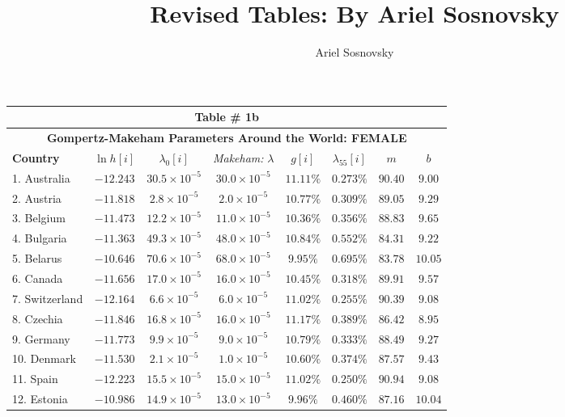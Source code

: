 \documentclass[12pt, titlepage]{article}%
\author{Ariel Sosnovsky}
\begin{document}
 \title{Revised Tables: By Ariel Sosnovsky}
 \maketitle
\clearpage
\begin{table}
\begin{center}
\begin{tabular}{||l|c|c|c|c|c|c|c||}
\hline\hline
\multicolumn{8}{||c||}{Table \# 1b } \\ \hline\hline
\multicolumn{8}{||c||}{{\bf Gompertz-Makeham Parameters Around the World: FEMALE}} \\ \hline\hline
{\bf Country} & $\ln h[i]$ & $\lambda_{0}[i]$ & {\em Makeham:} $\lambda$ & $g[i]$ & $\lambda_{55}[i]$ & $m$ & $b$ \\ \hline \hline
1. Australia &  $-12.243$ & $30.5\times10^{-5}$ & $30.0\times10^{-5}$ & $11.11\%$ & $0.273\%$ & $90.40$ & $9.00$\\ \hline
2. Austria &  $-11.818$ & $2.8\times10^{-5}$ & $2.0\times10^{-5}$ & $10.77\%$ & $0.309\%$ & $89.05$ & $9.29$\\ \hline
3. Belgium &  $-11.473$ & $12.2\times10^{-5}$ & $11.0\times10^{-5}$ & $10.36\%$ & $0.356\%$ & $88.83$ & $9.65$\\ \hline
4. Bulgaria &  $-11.363$ & $49.3\times10^{-5}$ & $48.0\times10^{-5}$ & $10.84\%$ & $0.552\%$ & $84.31$ & $9.22$\\ \hline
5. Belarus &  $-10.646$ & $70.6\times10^{-5}$ & $68.0\times10^{-5}$ & $9.95\%$ & $0.695\%$ & $83.78$ & $10.05$\\ \hline
6. Canada &  $-11.656$ & $17.0\times10^{-5}$ & $16.0\times10^{-5}$ & $10.45\%$ & $0.318\%$ & $89.91$ & $9.57$\\ \hline
7. Switzerland &  $-12.164$ & $6.6\times10^{-5}$ & $6.0\times10^{-5}$ & $11.02\%$ & $0.255\%$ & $90.39$ & $9.08$\\ \hline
8. Czechia &  $-11.846$ & $16.8\times10^{-5}$ & $16.0\times10^{-5}$ & $11.17\%$ & $0.389\%$ & $86.42$ & $8.95$\\ \hline
9. Germany &  $-11.773$ & $9.9\times10^{-5}$ & $9.0\times10^{-5}$ & $10.79\%$ & $0.333\%$ & $88.49$ & $9.27$\\ \hline
10. Denmark &  $-11.530$ & $2.1\times10^{-5}$ & $1.0\times10^{-5}$ & $10.60\%$ & $0.374\%$ & $87.57$ & $9.43$\\ \hline
11. Spain &  $-12.223$ & $15.5\times10^{-5}$ & $15.0\times10^{-5}$ & $11.02\%$ & $0.250\%$ & $90.94$ & $9.08$\\ \hline
12. Estonia &  $-10.986$ & $14.9\times10^{-5}$ & $13.0\times10^{-5}$ & $9.96\%$ & $0.460\%$ & $87.16$ & $10.04$\\ \hline

\end{tabular}
\end{center}
\end{table}
\end{document}
